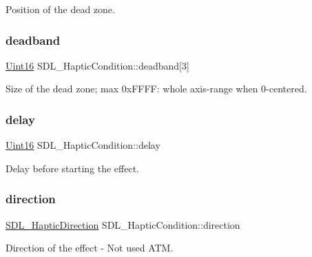 Position of the dead zone. \mbox{\label{struct_s_d_l___haptic_condition_af684c8eeeb719739a32723c00c5a2bbd}} 
\subsubsection{\texorpdfstring{deadband}{deadband}}
{\footnotesize\ttfamily \mbox{\hyperlink{_s_d_l__stdinc_8h_a31fcc0a076c9068668173ee26d33e42b}{Uint16}} S\+D\+L\+\_\+\+Haptic\+Condition\+::deadband\mbox{[}3\mbox{]}}

Size of the dead zone; max 0x\+F\+F\+FF\+: whole axis-\/range when 0-\/centered. \mbox{\label{struct_s_d_l___haptic_condition_aad40417980530ca8d80c62ba864a090b}} 
\subsubsection{\texorpdfstring{delay}{delay}}
{\footnotesize\ttfamily \mbox{\hyperlink{_s_d_l__stdinc_8h_a31fcc0a076c9068668173ee26d33e42b}{Uint16}} S\+D\+L\+\_\+\+Haptic\+Condition\+::delay}

Delay before starting the effect. \mbox{\label{struct_s_d_l___haptic_condition_a728507d30d18998949313de3a25e5581}} 
\subsubsection{\texorpdfstring{direction}{direction}}
{\footnotesize\ttfamily \mbox{\hyperlink{struct_s_d_l___haptic_direction}{S\+D\+L\+\_\+\+Haptic\+Direction}} S\+D\+L\+\_\+\+Haptic\+Condition\+::direction}

Direction of the effect -\/ Not used A\+TM. \mbox{\label{struct_s_d_l___haptic_condition_aafc182abea1078bed7e9cf5d0e713ea2}} 
